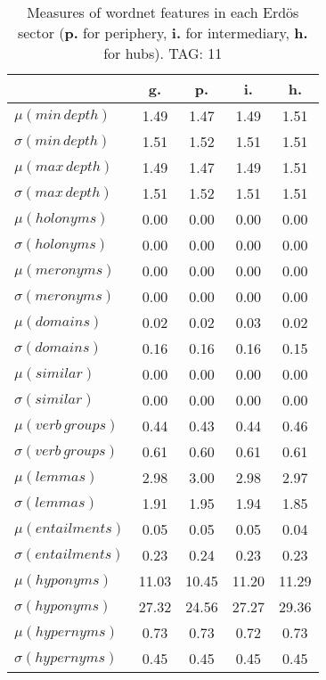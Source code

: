 \begin{table}[h!]
\begin{center}
\begin{tabular}{| l | c | c | c | c |}\hline
 & g. & p. & i. & h. \\\hline
$\mu(min\,depth)$ & 1.49  & 1.47  & 1.49  & 1.51 \\\hline
$\sigma(min\,depth)$ & 1.51  & 1.52  & 1.51  & 1.51 \\\hline
$\mu(max\,depth)$ & 1.49  & 1.47  & 1.49  & 1.51 \\\hline
$\sigma(max\,depth)$ & 1.51  & 1.52  & 1.51  & 1.51 \\\hline
$\mu(holonyms)$ & 0.00  & 0.00  & 0.00  & 0.00 \\\hline
$\sigma(holonyms)$ & 0.00  & 0.00  & 0.00  & 0.00 \\\hline
$\mu(meronyms)$ & 0.00  & 0.00  & 0.00  & 0.00 \\\hline
$\sigma(meronyms)$ & 0.00  & 0.00  & 0.00  & 0.00 \\\hline
$\mu(domains)$ & 0.02  & 0.02  & 0.03  & 0.02 \\\hline
$\sigma(domains)$ & 0.16  & 0.16  & 0.16  & 0.15 \\\hline
$\mu(similar)$ & 0.00  & 0.00  & 0.00  & 0.00 \\\hline
$\sigma(similar)$ & 0.00  & 0.00  & 0.00  & 0.00 \\\hline
$\mu(verb\,groups)$ & 0.44  & 0.43  & 0.44  & 0.46 \\\hline
$\sigma(verb\,groups)$ & 0.61  & 0.60  & 0.61  & 0.61 \\\hline
$\mu(lemmas)$ & 2.98  & 3.00  & 2.98  & 2.97 \\\hline
$\sigma(lemmas)$ & 1.91  & 1.95  & 1.94  & 1.85 \\\hline
$\mu(entailments)$ & 0.05  & 0.05  & 0.05  & 0.04 \\\hline
$\sigma(entailments)$ & 0.23  & 0.24  & 0.23  & 0.23 \\\hline
$\mu(hyponyms)$ & 11.03  & 10.45  & 11.20  & 11.29 \\\hline
$\sigma(hyponyms)$ & 27.32  & 24.56  & 27.27  & 29.36 \\\hline
$\mu(hypernyms)$ & 0.73  & 0.73  & 0.72  & 0.73 \\\hline
$\sigma(hypernyms)$ & 0.45  & 0.45  & 0.45  & 0.45 \\\hline
\end{tabular}
\caption{Measures of wordnet features in each Erd\"os sector ({{\bf p.}} for periphery, {{\bf i.}} for intermediary, {{\bf h.}} for hubs). TAG: 11}
\end{center}
\end{table}
